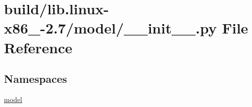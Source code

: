 \hypertarget{build_2lib_8linux-x86__64-2_87_2model_2____init_____8py}{}\section{build/lib.linux-\/x86\+\_-\/2.7/model/\+\_\+\+\_\+init\+\_\+\+\_\+.py File Reference}
\label{build_2lib_8linux-x86__64-2_87_2model_2____init_____8py}
\subsection*{Namespaces}
\begin{DoxyCompactItemize}
\item 
 \hyperlink{namespacemodel}{model}
\end{DoxyCompactItemize}
